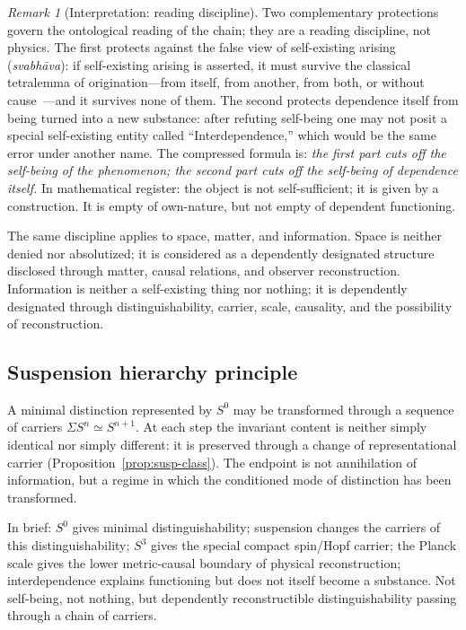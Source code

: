 \documentclass[11pt,a4paper]{article}
\theoremstyle{definition}
\theoremstyle{remark}
\newtheorem{remark}[theorem]{Remark}
\newcommand{\Sn}[1]{S^{#1}}
\newcommand{\Szero}{S^{0}}
\newcommand{\Sthree}{S^{3}}
\begin{document}
\begin{remark}[Interpretation: reading discipline]
Two complementary protections govern the ontological reading of the chain; they are a reading
discipline, not physics.  The first protects against the false view of self-existing arising
(\emph{svabh\=ava}): if self-existing arising is asserted, it must survive the classical
tetralemma of origination---from itself, from another, from both, or without
cause~\cite{Garfield1995}---and it survives none of them.  The second protects dependence
itself from being turned into a new substance: after refuting self-being one may not posit a
special self-existing entity called ``Interdependence,'' which would be the same error under
another name.  The compressed formula is: \emph{the first part cuts off the self-being of the
phenomenon; the second part cuts off the self-being of dependence itself.}  In mathematical
register: the object is not self-sufficient; it is given by a construction.  It is empty of
own-nature, but not empty of dependent functioning.

The same discipline applies to space, matter, and information.  Space is neither denied nor
absolutized; it is considered as a dependently designated structure disclosed through matter,
causal relations, and observer reconstruction.  Information is neither a self-existing thing nor
nothing; it is dependently designated through distinguishability, carrier, scale, causality, and
the possibility of reconstruction.
\end{remark}

\subsection{Suspension hierarchy principle}

\begin{tcolorbox}[colback=gray!4,colframe=gray!50,title=Suspension hierarchy principle (Interpretation)]
A minimal distinction represented by $\Szero$ may be transformed through a sequence of carriers
$\Sigma\Sn{n}\simeq\Sn{n+1}$.  At each step the invariant content is neither simply identical
nor simply different: it is preserved through a change of representational carrier
(Proposition~\ref{prop:susp-class}).  The endpoint is not annihilation of information, but a
regime in which the conditioned mode of distinction has been transformed.
\end{tcolorbox}

In brief: $\Szero$ gives minimal distinguishability; suspension changes the carriers of this
distinguishability; $\Sthree$ gives the special compact spin/Hopf carrier; the Planck scale
gives the lower metric-causal boundary of physical reconstruction; interdependence explains
functioning but does not itself become a substance.  Not self-being, not nothing, but
dependently reconstructible distinguishability passing through a chain of carriers.
\end{document}
